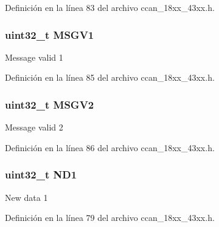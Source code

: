 Definición en la línea 83 del archivo ccan\+\_\+18xx\+\_\+43xx.\+h.

\subsubsection[{\texorpdfstring{M\+S\+G\+V1}{MSGV1}}]{ uint32\+\_\+t M\+S\+G\+V1}\hypertarget{struct_l_p_c___c_c_a_n___t_a709e6d05a057c93effc398f74dbe0ff1}{}\label{struct_l_p_c___c_c_a_n___t_a709e6d05a057c93effc398f74dbe0ff1}
Message valid 1 

Definición en la línea 85 del archivo ccan\+\_\+18xx\+\_\+43xx.\+h.

\subsubsection[{\texorpdfstring{M\+S\+G\+V2}{MSGV2}}]{ uint32\+\_\+t M\+S\+G\+V2}\hypertarget{struct_l_p_c___c_c_a_n___t_ab4528d1ef41869057b53d3c68074802a}{}\label{struct_l_p_c___c_c_a_n___t_ab4528d1ef41869057b53d3c68074802a}
Message valid 2 

Definición en la línea 86 del archivo ccan\+\_\+18xx\+\_\+43xx.\+h.

\subsubsection[{\texorpdfstring{N\+D1}{ND1}}]{ uint32\+\_\+t N\+D1}\hypertarget{struct_l_p_c___c_c_a_n___t_a65f32ab732a63e8469680b75ba8fd690}{}\label{struct_l_p_c___c_c_a_n___t_a65f32ab732a63e8469680b75ba8fd690}
New data 1 

Definición en la línea 79 del archivo ccan\+\_\+18xx\+\_\+43xx.\+h.

